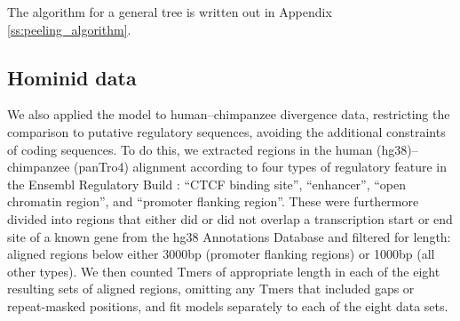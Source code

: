 \documentclass{article}
\theoremstyle{plain}
\theoremstyle{definition}
\begin{document}
The algorithm for a general tree is written out in Appendix \ref{ss:peeling_algorithm}.


\subsection{Hominid data}

We also applied the model to human--chimpanzee divergence data, 
restricting the comparison to putative regulatory sequences,
avoiding the additional constraints of coding sequences.
To do this, we extracted regions in the human (hg38)--chimpanzee (panTro4) alignment \citep[from the UCSC Genome Browser][]{pantroalign}
according to four types of regulatory feature in the Ensembl Regulatory Build \citep[release 81][]{ensebml}:
``CTCF binding site'', ``enhancer'', ``open chromatin region'', and ``promoter flanking region''.
These were furthermore divided into regions that either did or did not overlap a transcription start or end site of a known gene
from the hg38 Annotations Database \citep{hg_annotationsdb}
and filtered for length:
aligned regions below either 3000bp (promoter flanking regions) or 1000bp (all other types).
We then counted Tmers of appropriate length in each of the eight resulting sets of aligned regions, omitting any Tmers that included gaps or repeat-masked positions,
and fit models separately to each of the eight data sets.
\end{document}
